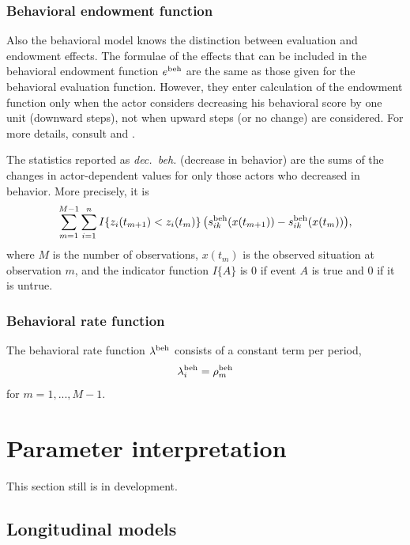 \documentclass[a4paper,fleqn]{article}
\newcommand{\+}{\, + \,}
\newcounter{savenumi}
\begin{document}
{\begin{enumerate}
\setcounter{savenumi}{\value{enumi}}
\end{enumerate}
\fi

\subsubsection{Behavioral endowment function}
Also the behavioral model knows the distinction between evaluation and
endowment effects. The formulae of the effects that can be included
in the behavioral endowment function $e^{\rm beh}$ are the same as
those given for the behavioral evaluation function. However, they enter
calculation of the endowment function only when the actor considers
decreasing his behavioral score by one unit (downward steps), not
when upward steps (or no change) are considered. For more details,
consult
\citet*{SnijdersEA07} and
\citet*{SteglichEA10}.

The statistics reported as \emph{dec.\ beh.} (decrease in behavior)
are the sums of the changes in actor-dependent values
for only those actors who decreased in behavior.
More precisely, it is
\begin{equation}
\sum_{m=1}^{M-1} \sum_{i=1}^n I\{z_{i}(t_{m+1}) < z_{i}(t_m) \}\,
     \big( s^{\rm beh}_{ik}(x(t_{m+1})) -  s^{\rm beh}_{ik}(x(t_m))   \big) ,
\end{equation}
where $M$ is the number of observations, $x(t_m)$ is the observed situation
at observation $m$, and the indicator function $I\{A\}$ is 0 if event $A$ is true
and 0 if it is untrue.

\subsubsection{Behavioral rate function}
The behavioral rate function $\lambda^{\rm beh}$ consists of a
constant term per period, \[ \lambda^{\rm beh}_{i} = \rho^{\rm
beh}_m \] for $m = 1, ..., M-1$.




\newpage
\section{Parameter interpretation}
\label{S_interpret}

This section still is in development.

\subsection{Longitudinal models}

}
\end{document}
